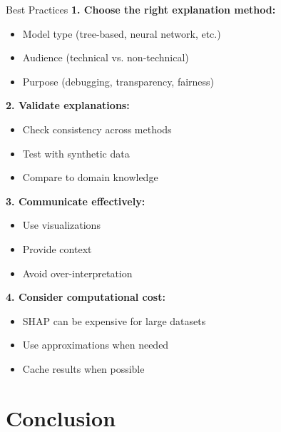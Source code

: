 \documentclass[aspectratio=169]{beamer}
\begin{document}
\begin{frame}{Best Practices}
  \textbf{1. Choose the right explanation method:}
  \begin{itemize}
    \item Model type (tree-based, neural network, etc.)
    \item Audience (technical vs. non-technical)
    \item Purpose (debugging, transparency, fairness)
  \end{itemize}

  \vspace{0.5em}

  \textbf{2. Validate explanations:}
  \begin{itemize}
    \item Check consistency across methods
    \item Test with synthetic data
    \item Compare to domain knowledge
  \end{itemize}

  \vspace{0.5em}

  \textbf{3. Communicate effectively:}
  \begin{itemize}
    \item Use visualizations
    \item Provide context
    \item Avoid over-interpretation
  \end{itemize}

  \vspace{0.5em}

  \textbf{4. Consider computational cost:}
  \begin{itemize}
    \item SHAP can be expensive for large datasets
    \item Use approximations when needed
    \item Cache results when possible
  \end{itemize}
\end{frame}

\section{Conclusion}
\end{document}
